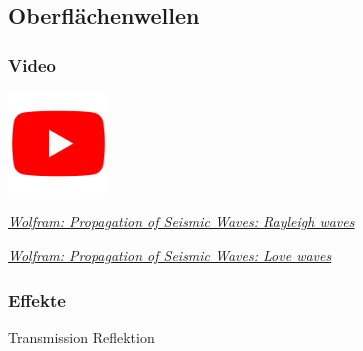 \subsection{Oberflächenwellen}

\begin{frame}
\frametitle{Video}
\begin{center}
\includegraphics[width=0.2\textwidth]{fig_img/youtube.png}   
\end{center}

\href{https://www.youtube.com/watch?v=6yXgfYHAS7c}{\textsl{Wolfram: Propagation of Seismic Waves: Rayleigh waves}}

\href{https://www.youtube.com/watch?v=t7wJu0Kts7w}{\textsl{Wolfram: Propagation of Seismic Waves: Love waves}}

\end{frame}

\begin{frame}
\frametitle{Effekte}
Transmission
Reflektion

\end{frame}
